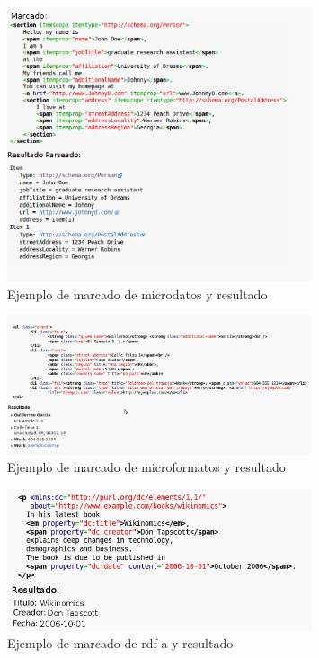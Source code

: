 \begin{figure}
    \centering
    \includegraphics[width=0.8\textwidth,natwidth=610,natheight=642]{microdata}
    \caption{Ejemplo de marcado de microdatos y resultado}
    \label{figure:microdata}
\end{figure}
\begin{figure}
    \centering
    \includegraphics[width=0.8\textwidth,natwidth=610,natheight=642]{microformats}
    \caption{Ejemplo de marcado de microformatos y resultado}
    \label{figure:microformats}
\end{figure}
\begin{figure}
    \centering
    \includegraphics[width=0.8\textwidth,natwidth=610,natheight=642]{rdfa}
    \caption{Ejemplo de marcado de rdf-a y resultado}
    \label{figure:rdfa}
\end{figure}

